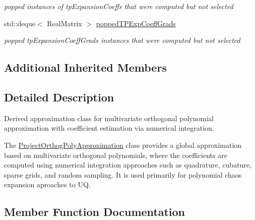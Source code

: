 \begin{DoxyCompactItemize}
\begin{DoxyCompactList}\small\item\em popped instances of tp\+Expansion\+Coeffs that were computed but not selected \end{DoxyCompactList}\item 
std\+::deque$<$ Real\+Matrix $>$ \hyperlink{classPecos_1_1ProjectOrthogPolyApproximation_a4b603cc9a41c6961d1eac56c3d86918d}{popped\+T\+P\+Exp\+Coeff\+Grads}\label{classPecos_1_1ProjectOrthogPolyApproximation_a4b603cc9a41c6961d1eac56c3d86918d}

\begin{DoxyCompactList}\small\item\em popped tp\+Expansion\+Coeff\+Grads instances that were computed but not selected \end{DoxyCompactList}\end{DoxyCompactItemize}
\subsection*{Additional Inherited Members}


\subsection{Detailed Description}
Derived approximation class for multivariate orthogonal polynomial approximation with coefficient estimation via numerical integration. 

The \hyperlink{classPecos_1_1ProjectOrthogPolyApproximation}{Project\+Orthog\+Poly\+Approximation} class provides a global approximation based on multivariate orthogonal polynomials, where the coefficients are computed using numerical integration approaches such as quadrature, cubature, sparse grids, and random sampling. It is used primarily for polynomial chaos expansion aproaches to UQ. 

\subsection{Member Function Documentation}
